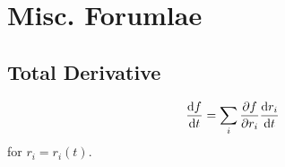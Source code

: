 \documentclass{book}
\begin{document}
\chapter{Misc. Forumlae}
\section{Total Derivative}
\begin{equation}
	\dv{f}{t} = \sum_i \pdv{f}{r_i}\dv{r_i}{t} \label{eq:totalderivative}
\end{equation}
for $r_i = r_i(t)$.
\end{document}
